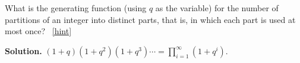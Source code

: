 \documentclass{book}
\begin{document}
\setcounter{project}{322}
\addtocounter{project}{-1}
\begin{activity}[]\label{activity-315}
\hypertarget{p-1664}{}%
What is the generating function (using \(q\) as the variable) for the number of partitions of an integer into distinct parts, that is, in which each part is used at most once?%
~\hfill{\tiny\hyperlink{a-322}{[hint]}\hypertarget{q-322}{}}\par\smallskip%
\noindent\textbf{Solution.}\hypertarget{solution-255}{}\quad%
\hypertarget{p-1666}{}%
\(\displaystyle (1+q)(1+q^2)(1+q^3)\cdots=
\prod_{i=1}^\infty(1+q^i)\).%
\end{activity}
\end{document}

